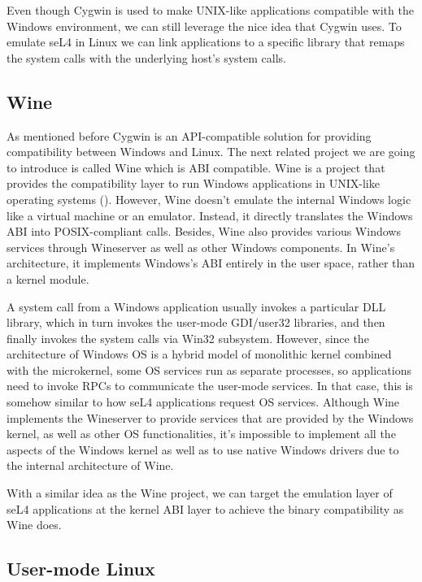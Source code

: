 Even though Cygwin is used to make UNIX-like applications compatible with the Windows environment, we can still leverage the nice idea that Cygwin uses. To emulate seL4 in Linux we can link applications to a specific library that remaps the system calls with the underlying host's system calls.

\subsection{Wine}


As mentioned before Cygwin is an API-compatible solution for providing compatibility between Windows and Linux. The next related project we are going to introduce is called Wine which is ABI compatible. Wine is a project that provides the compatibility layer to run Windows applications in UNIX-like operating systems (\cite{enwikiWine}). However, Wine doesn't emulate the internal Windows logic like a virtual machine or an emulator. Instead, it directly translates the Windows ABI into POSIX-compliant calls. Besides, Wine also provides various Windows services through Wineserver as well as other Windows components. In Wine's architecture, it implements Windows's ABI entirely in the user space, rather than a kernel module. 

A system call from a Windows application usually invokes a particular DLL library, which in turn invokes the user-mode GDI/user32 libraries, and then finally invokes the system calls via Win32 subsystem. However, since the architecture of Windows OS is a hybrid model of monolithic kernel combined with the microkernel, some OS services run as separate processes, so applications need to invoke RPCs to communicate the user-mode services. In that case, this is somehow similar to how seL4 applications request OS services. Although Wine implements the Wineserver to provide services that are provided by the Windows kernel, as well as other OS functionalities, it's impossible to implement all the aspects of the Windows kernel as well as to use native Windows drivers due to the internal architecture of Wine. 

With a similar idea as the Wine project, we can target the emulation layer of seL4 applications at the kernel ABI layer to achieve the binary compatibility as Wine does.       

\subsection{User-mode Linux}

